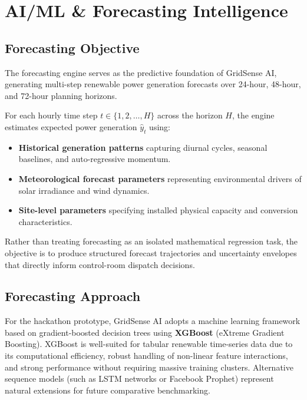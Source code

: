 \section{AI/ML \& Forecasting Intelligence}
\label{sec:ai_ml_forecasting}

\subsection{Forecasting Objective}
\label{subsec:forecasting_objective}

The forecasting engine serves as the predictive foundation of GridSense AI, generating multi-step renewable power generation forecasts over 24-hour, 48-hour, and 72-hour planning horizons.

For each hourly time step $t \in \{1, 2, \dots, H\}$ across the horizon $H$, the engine estimates expected power generation $\hat{y}_t$ using:
\begin{itemize}[leftmargin=1.8em, itemsep=0.2em]
    \item \textbf{Historical generation patterns} capturing diurnal cycles, seasonal baselines, and auto-regressive momentum.
    \item \textbf{Meteorological forecast parameters} representing environmental drivers of solar irradiance and wind dynamics.
    \item \textbf{Site-level parameters} specifying installed physical capacity and conversion characteristics.
\end{itemize}

Rather than treating forecasting as an isolated mathematical regression task, the objective is to produce structured forecast trajectories and uncertainty envelopes that directly inform control-room dispatch decisions.

\subsection{Forecasting Approach}
\label{subsec:forecasting_approach}

For the hackathon prototype, GridSense AI adopts a machine learning framework based on gradient-boosted decision trees using \textbf{XGBoost} (eXtreme Gradient Boosting). XGBoost is well-suited for tabular renewable time-series data due to its computational efficiency, robust handling of non-linear feature interactions, and strong performance without requiring massive training clusters. Alternative sequence models (such as LSTM networks or Facebook Prophet) represent natural extensions for future comparative benchmarking.

